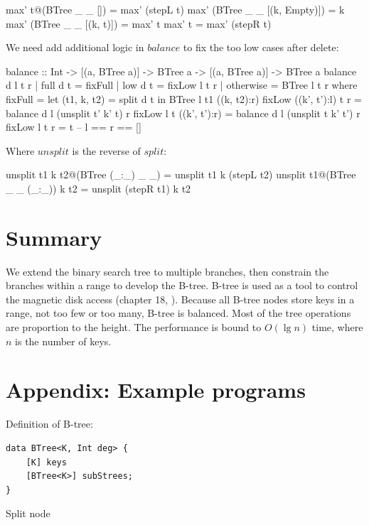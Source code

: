 \documentclass[b5paper]{article}
\begin{document}
\begin{Answer}[ref = {ex:btree-del}]
{\begin{Haskell}
max' t@(BTree _ _ []) = max' (stepL t)
max' (BTree _ _ [(k, Empty)]) = k
max' (BTree _ _ [(k, t)]) = max' t
max' t = max' (stepR t)
\end{Haskell}

We need add additional logic in $balance$ to fix the too low cases after delete:

\begin{Haskell}
balance :: Int -> [(a, BTree a)] -> BTree a -> [(a, BTree a)] -> BTree a
balance d l t r | full d t = fixFull
                | low  d t = fixLow l t r
                | otherwise = BTree l t r
  where
    fixFull = let (t1, k, t2) = split d t in BTree l t1 ((k, t2):r)
    fixLow ((k', t'):l) t r = balance d l (unsplit t' k' t) r
    fixLow l t ((k', t'):r) = balance d l (unsplit t k' t') r
    fixLow l t r = t        -- l == r == []
\end{Haskell}

Where $unsplit$ is the reverse of $split$:

\begin{Haskell}
unsplit t1 k t2@(BTree (_:_) _ _) = unsplit t1 k (stepL t2)
unsplit t1@(BTree _ _ (_:_)) k t2 = unsplit (stepR t1) k t2
\end{Haskell}
}
\end{Answer}

\section{Summary}
We extend the binary search tree to multiple branches, then constrain the branches within a range to develop the B-tree. B-tree is used as a tool to control the magnetic disk access (chapter 18, \cite{CLRS}). Because all B-tree nodes store keys in a range, not too few or too many, B-tree is balanced. Most of the tree operations are proportion to the height. The performance is bound to $O(\lg n)$ time, where $n$ is the number of keys.

\section{Appendix: Example programs}

Definition of B-tree:

\begin{lstlisting}[language = Bourbaki]
data BTree<K, Int deg> {
    [K] keys
    [BTree<K>] subStrees;
}
\end{lstlisting}

Split node
\end{document}
